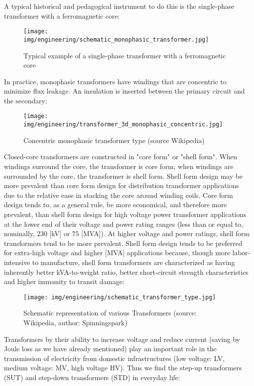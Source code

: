 	A typical historical and pedagogical instrument to do this is the single-phase transformer with a ferromagnetic core:
	\begin{figure}[H]
		\centering
		\texttt{[image: img/engineering/schematic\_monophasic\_transformer.jpg]}
		\caption{Typical example of a single-phase transformer with a ferromagnetic core}
	\end{figure}
	In practice, monophasic transformers have windings that are concentric to minimize flux leakage. An insulation is inserted between the primary circuit and the secondary:
	\begin{figure}[H]
		\centering
		\texttt{[image: img/engineering/transformer\_3d\_monophasic\_concentric.jpg]}
		\caption{Concentric monophasic transformer type (source Wikipedia)}
	\end{figure}
	Closed-core transformers are constructed in "core form" or "shell form". When windings surround the core, the transformer is core form; when windings are surrounded by the core, the transformer is shell form. Shell form design may be more prevalent than core form design for distribution transformer applications due to the relative ease in stacking the core around winding coils. Core form design tends to, as a general rule, be more economical, and therefore more prevalent, than shell form design for high voltage power transformer applications at the lower end of their voltage and power rating ranges (less than or equal to, nominally, $230$ [kV] or $75$ [MVA]). At higher voltage and power ratings, shell form transformers tend to be more prevalent. Shell form design tends to be preferred for extra-high voltage and higher [MVA] applications because, though more labor-intensive to manufacture, shell form transformers are characterized as having inherently better kVA-to-weight ratio, better short-circuit strength characteristics and higher immunity to transit damage:
	\begin{figure}[H]
		\centering
		\texttt{[image: img/engineering/schematic\_transformer\_type.jpg]}
		\caption{Schematic representation of various Transformers (source: Wikipedia, author: Spinningspark)}
	\end{figure}
	Transformers by their ability to increase voltage and reduce current (saving by Joule loss as we have already mentioned) play an important role in the transmission of electricity from domestic infrastructures (low voltage: LV, medium voltage: MV, high voltage HV). Thus we find the step-up transformers (SUT) and step-down transformers (STD) in everyday life:
